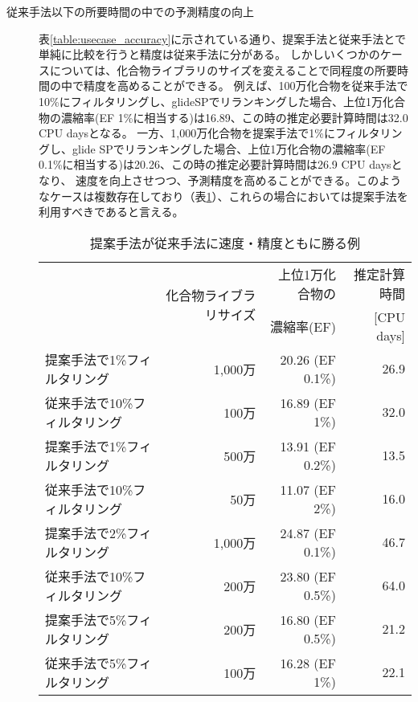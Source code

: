 \begin{description}
\item[従来手法以下の所要時間の中での予測精度の向上]
	表\ref{table:usecase_accuracy}に示されている通り、提案手法と従来手法とで単純に比較を行うと精度は従来手法に分がある。
	しかしいくつかのケースについては、化合物ライブラリのサイズを変えることで同程度の所要時間の中で精度を高めることができる。
	例えば、100万化合物を従来手法で10\%にフィルタリングし、glideSPでリランキングした場合、上位1万化合物の濃縮率(EF 1\%に相当する)は16.89、この時の推定必要計算時間は32.0 CPU daysとなる。
	一方、1,000万化合物を提案手法で1\%にフィルタリングし、glide SPでリランキングした場合、上位1万化合物の濃縮率(EF 0.1\%に相当する)は20.26、この時の推定必要計算時間は26.9 CPU daysとなり、
	速度を向上させつつ、予測精度を高めることができる。このようなケースは複数存在しており（表\ref{table:win_proposal_case}）、これらの場合においては提案手法を利用すべきであると言える。
\begin{table}[htbp] \centering
	\caption{提案手法が従来手法に速度・精度ともに勝る例}
	\label{table:win_proposal_case}
	\begin{tabular}{l|rrr}
	\hline
												&\multirow{2}{*}{化合物ライブラリサイズ}	&上位1万化合物の		&推定計算時間	\\
												&														&濃縮率(EF)				&[CPU days]		\\ \hline
	提案手法で1\%フィルタリング		&1,000万											&20.26 (EF 0.1\%)		&26.9				\\
	従来手法で10\%フィルタリング	&100万												&16.89 (EF 1\%)			&32.0				\\ \hline
	提案手法で1\%フィルタリング		&500万												&13.91 (EF 0.2\%)		&13.5				\\
	従来手法で10\%フィルタリング	&50万												&11.07 (EF 2\%)			&16.0				\\ \hline
	提案手法で2\%フィルタリング		&1,000万											&24.87 (EF 0.1\%)		&46.7				\\
	従来手法で10\%フィルタリング	&200万												&23.80 (EF 0.5\%)		&64.0				\\ \hline
	提案手法で5\%フィルタリング		&200万												&16.80 (EF 0.5\%)		&21.2				\\
	従来手法で5\%フィルタリング		&100万												&16.28 (EF 1\%)			&22.1				\\ \hline
	

	\end{tabular}
\end{table}
	
\end{description}
